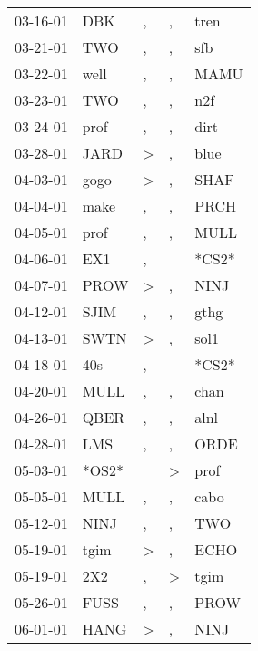 \begin{supertabular}{lllll}
 03-16-01 &    DBK &                , &                , &   tren \\
 03-21-01 &    TWO &                , &                , &    sfb \\
 03-22-01 &   well &                , &                , &   MAMU \\
 03-23-01 &    TWO &                , &                , &    n2f \\
 03-24-01 &   prof &                , &                , &   dirt \\
 03-28-01 &   JARD &     \textgreater &                , &   blue \\
 04-03-01 &   gogo &     \textgreater &                , &   SHAF \\
 04-04-01 &   make &                , &                , &   PRCH \\
 04-05-01 &   prof &                , &                , &   MULL \\
 04-06-01 &    EX1 &                , &                  &  *CS2* \\
 04-07-01 &   PROW &     \textgreater &                , &   NINJ \\
 04-12-01 &   SJIM &                , &                , &   gthg \\
 04-13-01 &   SWTN &     \textgreater &                , &   sol1 \\
 04-18-01 &    40s &                , &                  &  *CS2* \\
 04-20-01 &   MULL &                , &                , &   chan \\
 04-26-01 &   QBER &                , &                , &   alnl \\
 04-28-01 &    LMS &                , &                , &   ORDE \\
 05-03-01 &  *OS2* &                  &     \textgreater &   prof \\
 05-05-01 &   MULL &                , &                , &   cabo \\
 05-12-01 &   NINJ &                , &                , &    TWO \\
 05-19-01 &   tgim &     \textgreater &                , &   ECHO \\
 05-19-01 &    2X2 &                , &     \textgreater &   tgim \\
 05-26-01 &   FUSS &                , &                , &   PROW \\
 06-01-01 &   HANG &     \textgreater &                , &   NINJ \\

\end{supertabular}
